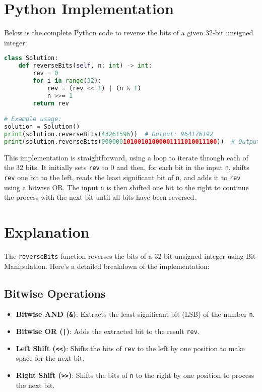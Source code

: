 \section*{Python Implementation}


Below is the complete Python code to reverse the bits of a given 32-bit unsigned integer:

\begin{fullwidth}
\begin{lstlisting}[language=Python]
class Solution:
    def reverseBits(self, n: int) -> int:
        rev = 0
        for i in range(32):
            rev = (rev << 1) | (n & 1)
            n >>= 1
        return rev

# Example usage:
solution = Solution()
print(solution.reverseBits(43261596))  # Output: 964176192
print(solution.reverseBits(00000010100101000001111010011100))  # Output: 964176192
\end{lstlisting}
\end{fullwidth}

This implementation is straightforward, using a loop to iterate through each of the 32 bits. It initially sets \texttt{rev} to 0 and then, for each bit in the input \texttt{n}, shifts \texttt{rev} one bit to the left, reads the least significant bit of \texttt{n}, and adds it to \texttt{rev} using a bitwise OR. The input \texttt{n} is then shifted one bit to the right to continue the process with the next bit until all bits have been reversed.

\section*{Explanation}

The \texttt{reverseBits} function reverses the bits of a 32-bit unsigned integer using Bit Manipulation. Here's a detailed breakdown of the implementation:

\subsection*{Bitwise Operations}

\begin{itemize}
    \item \textbf{Bitwise AND (\texttt{\&})}: Extracts the least significant bit (LSB) of the number \texttt{n}.
    
    \item \textbf{Bitwise OR (\texttt{|})}: Adds the extracted bit to the result \texttt{rev}.
    
    \item \textbf{Left Shift (\texttt{<<})}: Shifts the bits of \texttt{rev} to the left by one position to make space for the next bit.
    
    \item \textbf{Right Shift (\texttt{>>})}: Shifts the bits of \texttt{n} to the right by one position to process the next bit.
\end{itemize}


